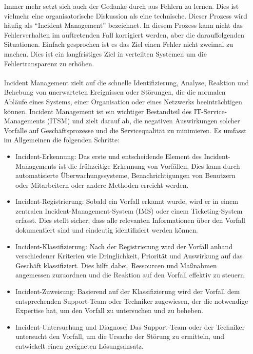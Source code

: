 \documentclass[../vs-script-first-v01.tex]{subfiles}
\begin{document}
\begin{itemize}
Immer mehr setzt sich auch der Gedanke durch aus Fehlern zu lernen. Dies ist vielmehr eine organisatorische Diskussion als eine technische. Dieser Prozess wird häufig als \enquote{Incident Management} bezeichnet. In diesem Prozess kann nicht das Fehlerverhalten im auftretenden Fall korrigiert werden, aber die darauffolgenden Situationen. Einfach gesprochen ist es das Ziel einen Fehler nicht zweimal zu machen. Dies ist ein langfristiges Ziel in verteilten Systemen um die Fehlertransparenz zu erhöhen. 
\\\\
Incident Management zielt auf die schnelle Identifizierung, Analyse, Reaktion und Behebung von unerwarteten Ereignissen oder Störungen, die die normalen Abläufe eines Systems, einer Organisation oder eines Netzwerks beeinträchtigen können. Incident Management ist ein wichtiger Bestandteil des IT-Service-Managements (ITSM) und zielt darauf ab, die negativen Auswirkungen solcher Vorfälle auf Geschäftsprozesse und die Servicequalität zu minimieren. Es umfasst im Allgemeinen die folgenden Schritte:
\begin{itemize}
\item Incident-Erkennung: Das erste und entscheidende Element des Incident-Managements ist die frühzeitige Erkennung von Vorfällen. Dies kann durch automatisierte Überwachungssysteme, Benachrichtigungen von Benutzern oder Mitarbeitern oder andere Methoden erreicht werden.
\item Incident-Registrierung: Sobald ein Vorfall erkannt wurde, wird er in einem zentralen Incident-Management-System (IMS) oder einem Ticketing-System erfasst. Dies stellt sicher, dass alle relevanten Informationen über den Vorfall dokumentiert sind und eindeutig identifiziert werden können.
\item Incident-Klassifizierung: Nach der Registrierung wird der Vorfall anhand verschiedener Kriterien wie Dringlichkeit, Priorität und Auswirkung auf das Geschäft klassifiziert. Dies hilft dabei, Ressourcen und Maßnahmen angemessen zuzuordnen und die Reaktion auf den Vorfall effektiv zu steuern.
\item Incident-Zuweisung: Basierend auf der Klassifizierung wird der Vorfall dem entsprechenden Support-Team oder Techniker zugewiesen, der die notwendige Expertise hat, um den Vorfall zu untersuchen und zu beheben.
\item Incident-Untersuchung und Diagnose: Das Support-Team oder der Techniker untersucht den Vorfall, um die Ursache der Störung zu ermitteln, und entwickelt einen geeigneten Lösungsansatz.

\end{itemize}
\end{itemize}
\end{document}

